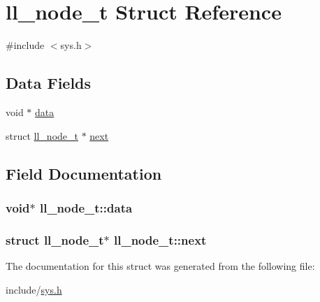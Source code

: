 \hypertarget{structll__node__t}{}\section{ll\+\_\+node\+\_\+t Struct Reference}
\label{structll__node__t}


{\ttfamily \#include $<$sys.\+h$>$}

\subsection*{Data Fields}
\begin{DoxyCompactItemize}
\item 
void $\ast$ \hyperlink{structll__node__t_a36aad8fd0c3ba441786bc4c8215f6fcc}{data}
\item 
struct \hyperlink{structll__node__t}{ll\+\_\+node\+\_\+t} $\ast$ \hyperlink{structll__node__t_a1e73ee32269c7b6cd253779dfa00d49d}{next}
\end{DoxyCompactItemize}


\subsection{Field Documentation}
\subsubsection[{\texorpdfstring{data}{data}}]{\setlength{\rightskip}{0pt plus 5cm}void$\ast$ ll\+\_\+node\+\_\+t\+::data}\hypertarget{structll__node__t_a36aad8fd0c3ba441786bc4c8215f6fcc}{}\label{structll__node__t_a36aad8fd0c3ba441786bc4c8215f6fcc}
\subsubsection[{\texorpdfstring{next}{next}}]{\setlength{\rightskip}{0pt plus 5cm}struct {\bf ll\+\_\+node\+\_\+t}$\ast$ ll\+\_\+node\+\_\+t\+::next}\hypertarget{structll__node__t_a1e73ee32269c7b6cd253779dfa00d49d}{}\label{structll__node__t_a1e73ee32269c7b6cd253779dfa00d49d}


The documentation for this struct was generated from the following file\+:\begin{DoxyCompactItemize}
\item 
include/\hyperlink{sys_8h}{sys.\+h}\end{DoxyCompactItemize}

